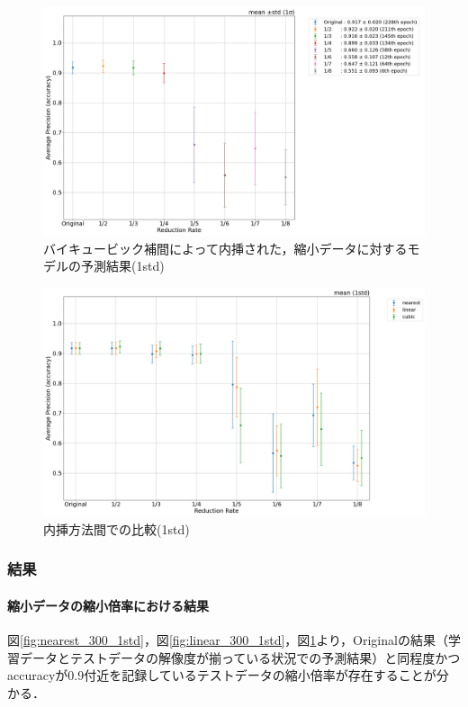 \documentclass[a4j, 11pt]{jreport}
\begin{document}
\begin{figure}[H]
  \centering
  \includegraphics[width=16cm]{images/5syou/print_errorbar/cubic/acc_with_errorbar_syuron5_cubic_900epoch_30run_300_acc_max_std1sigma.png}
  \caption{バイキュービック補間によって内挿された，縮小データに対するモデルの予測結果(1std)}
  \label{fig:cubic_300_1std}
\end{figure}

\begin{figure}[H]
  \centering
  \includegraphics[width=16cm]{images/5syou/print_errorbar/print_errorbar_inter_comparison/acc_with_errorbar_syuron5_inter_comparison_900epoch_30run_300_acc_max_std1sigma.png}
  \caption{内挿方法間での比較(1std)}
  \label{fig:inter_comparison_300_1std}
\end{figure}


\subsubsection{結果}
\paragraph{縮小データの縮小倍率における結果}
図\ref{fig:nearest_300_1std}，図\ref{fig:linear_300_1std}，図\ref{fig:cubic_300_1std}より，Originalの結果（学習データとテストデータの解像度が揃っている状況での予測結果）と同程度かつaccuracyが0.9付近を記録しているテストデータの縮小倍率が存在することが分かる．
\end{document}
